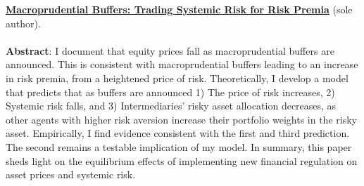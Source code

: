 \documentclass[11pt]{res} %
\begin{document}
\begin{resume}
\begin{etaremune}
\item \href{https://papers.ssrn.com/abstract=3557231}{\bf Macroprudential Buffers: Trading Systemic Risk for Risk Premia} (sole author).\\
\\[-0.9em]
\textbf{Abstract}: 
I document that equity prices fall as macroprudential buffers are announced. This is consistent with macroprudential buffers leading to an increase in risk premia, from a heightened price of risk. Theoretically, I develop a model that predicts that as buffers are announced 1) The price of risk increases, 2) Systemic risk falls, and 3) Intermediaries' risky asset allocation decreases, as other agents with higher risk aversion increase their portfolio weights in the risky asset. Empirically, I find evidence consistent with the first and third prediction. The second remains a testable implication of my model. In summary, this paper sheds light on the equilibrium effects of implementing new financial regulation on asset prices and systemic risk.\\



\end{etaremune}
\end{resume}
\end{document}
